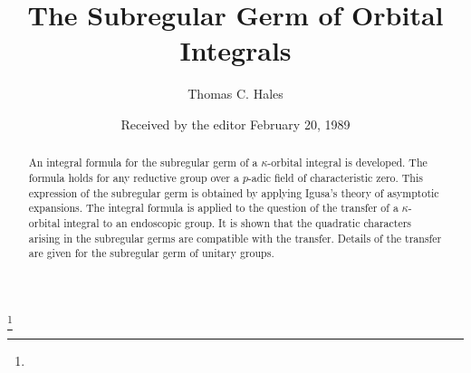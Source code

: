 \documentclass{memo-l}
\theoremstyle{definition}
\theoremstyle{remark}
\numberwithin{section}{chapter}
\numberwithin{equation}{chapter}
\begin{document}
\frontmatter

\title{The Subregular Germ of Orbital Integrals}
\author{Thomas C. Hales}
\address{}
\curraddr{}
\email{}
\thanks{}
\date{Received by the
	editor February 20, 1989}


\keywords{}


\maketitle

\tableofcontents

\begin{abstract} 
  An integral formula for the subregular germ of a $\kappa$-orbital
  integral is developed.  The formula holds for any reductive group
  over a $p$-adic field of characteristic zero.  This expression of
  the subregular germ is obtained by applying Igusa's theory of
  asymptotic expansions.  The integral formula is applied to the
  question of the transfer of a $\kappa$-orbital integral to an
  endoscopic group.  It is shown that the quadratic characters arising
  in the subregular germs are compatible with the transfer.  Details
  of the transfer are given for the subregular germ of unitary groups.
\end{abstract}

%

%








\newcommand\AAA{{\Bbb A}}                   \newcommand\BB{{\Bbb B\,}}
\newcommand\CC{{\Bbb C}}                    \newcommand\GG{{\Bbb G}}
\newcommand\PP{{\Bbb P}}                    \newcommand\RR{{\Bbb R}}
\newcommand\TT{{\Bbb T}}                    \newcommand\ZZ{{\Bbb Z}}
\newcommand\bWW{{\Bbb W}}                       \newcommand\bW{\bold{W}}
\end{document}
